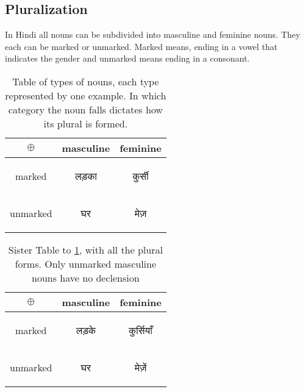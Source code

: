\documentclass[12pt]{scrartcl}
\begin{document}
\subsection{Pluralization}

In Hindi all nouns can be subdivided into masculine and feminine nouns. They each can be marked or unmarked. Marked means, ending in a vowel that indicates the gender and unmarked means ending in a consonant.

\begin{table}[H]
    \centering
    \begin{tabular}{c|c|c}
       $\oplus$  & masculine & feminine \\ \hline
        marked  &  \begin{hindi} लड़का \end{hindi}& \begin{hindi}  कुर्सी\end{hindi} \\ \hline 
        unmarked  & \begin{hindi} घर \end{hindi}  & \begin{hindi} मेज़ \end{hindi} \\ 
    \end{tabular}
    \caption{Table of types of nouns, each type represented by one example. In which category the noun falls dictates how its plural is formed.}
    \label{tab:plural}
\end{table}

\begin{table}[H]
    \centering
    \begin{tabular}{c|c|c}
       $\oplus$  & masculine & feminine \\ \hline
        marked  &  \begin{hindi} लड़के \end{hindi}& \begin{hindi} कुर्सियाँ\end{hindi} \\ \hline 
        unmarked  & \begin{hindi} घर \end{hindi}  & \begin{hindi} मेज़ें \end{hindi} \\ 
    \end{tabular}
    \caption{Sister Table to \ref{tab:plural}, with all the plural forms. Only unmarked masculine nouns have no declension}
    \label{tab:plural_sister}
\end{table}
\end{document}
